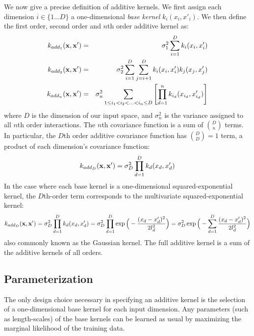 We now give a precise definition of additive kernels.  We first assign each dimension $i \in \{1 \dots D\}$ a one-dimensional \emph{base kernel} $k_i(x_i, x'_i)$.  We then define the first order, second order and $n$th order additive kernel as:
\begin{eqnarray}
k_{add_1}({\bf x, x'}) & = & \sigma_1^2 \sum_{i=1}^D k_i(x_i, x_i') \\
k_{add_2}({\bf x, x'}) & = & \sigma_2^2 \sum_{i=1}^D \sum_{j = i + 1}^D k_i(x_i, x_i') k_j(x_j, x_j') \\
k_{add_n}({\bf x, x'}) & = & \sigma_n^2 \sum_{1 \leq i_1 < i_2 < ... < i_n \leq D} \left[ \prod_{d=1}^n k_{i_d}(x_{i_d}, x_{i_d}') \right]
\end{eqnarray}
where $D$ is the dimension of our input space, and $\sigma_n^2$ is the variance assigned to all $n$th order interactions. The $n$th covariance function is a sum of ${D \choose n}$ terms.  In particular, the $D$th order additive covariance function has ${D \choose D} = 1$ term, a product of each dimension's covariance function:
\begin{equation}
k_{add_D}({\bf x, x'}) = \sigma_D^2 \prod_{d=1}^D k_{d}(x_{d}, x_{d}')
\end{equation}
In the case where each base kernel is a one-dimensional squared-exponential kernel, the $D$th-order term corresponds to the multivariate squared-exponential kernel:
\begin{equation}
k_{add_D}({\bf x, x'}) = \sigma_D^2 \prod_{d=1}^D k_{d}(x_{d}, x_{d}') = \sigma_D^2 \prod_{d=1}^D \exp \Big( -\frac{ ( x_{d} - x_{d}')^2}{2l^2_d} \Big) = \sigma_D^2  \exp \Big( -\sum_{d=1}^D \frac{ ( x_{d} - x_{d}')^2}{2l^2_d} \Big)
\end{equation}
also commonly known as the Gaussian kernel.  The full additive kernel is a sum of the additive kernels of all orders.
%
\subsection{Parameterization}

The only design choice necessary in specifying an additive kernel is the selection of a one-dimensional base kernel for each input dimension.  Any parameters (such as length-scales) of the base kernels can be learned as usual by maximizing the marginal likelihood of the training data.  

